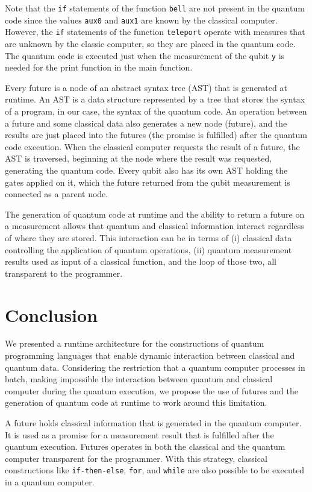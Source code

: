 \documentclass[preprint,3p,times,twocolumn]{elsarticle}
\begin{document}
Note that the \texttt{if} statements of the function \texttt{bell} are not
present in the quantum code since the values \texttt{aux0} and \texttt{aux1}
are known by the classical computer.  However, the \texttt{if} statements of
the function \texttt{teleport} operate with measures that are unknown by the
classic computer, so they are placed in the quantum code. The quantum code is
executed just when the measurement of the qubit \texttt{y} is needed for the
print function in the main function. 

Every future is a node of an abstract syntax tree (AST) that is generated at
runtime. An AST is a data structure represented by a tree that stores the
syntax of a program, in our case, the syntax of the quantum code. An operation
between a future and some classical data also generates a new node (future),
and the results are just placed into the futures (the promise is fulfilled)
after the quantum code execution.  When the classical computer requests the
result of a future, the AST is traversed, beginning at the node where the
result was requested, generating the quantum code. Every qubit also has its own
AST holding the gates applied on it,  which the future returned from the qubit
measurement is connected as a parent node.

The generation of quantum code at runtime and the ability to return a future on
a measurement allows that quantum and classical information interact regardless
of where they are stored. This interaction can be in terms of (i) classical
data controlling the application of quantum operations, (ii) quantum
measurement results used as input of a classical function, and the loop of
those two, all transparent to the programmer.

\section{Conclusion}
\label{sec:conclusion}

We presented a runtime architecture for the constructions of quantum
programming languages that enable dynamic interaction between classical and
quantum data. Considering the restriction that a quantum computer processes in
batch, making impossible the interaction between quantum and classical computer
during the quantum execution, we propose the use of futures and the generation
of quantum code at runtime to work around this limitation. 

A future holds classical information that is generated in the quantum computer.
It is used as a promise for a measurement result that is fulfilled after the
quantum execution. Futures operates in both the classical and the quantum
computer transparent for the programmer. With this strategy, classical
constructions like \texttt{if-then-else}, \texttt{for}, and \texttt{while} are
also possible to be executed in a quantum computer. 
\end{document}
